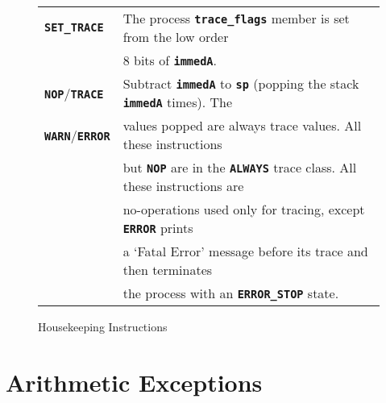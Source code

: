 \documentclass[12pt]{article}
\newcommand{\TT}[1]{{\tt \bfseries #1}}
\newlength{\figurewidth}
\newenvironment{boxedfigure}[1][!btp]%
	{\begin{figure*}[#1]
	 \begin{lrbox}{\figurebox}
	 \begin{minipage}{\figurewidth}

	 \vspace*{1ex}}%
	{
	 \vspace*{1ex}

	 \end{minipage}
	 \end{lrbox}

	 \centering
	 \fbox{\hspace*{0.1in}\usebox{\figurebox}\hspace*{0.1in}}
	 \end{figure*}}
\begin{document}
\begin{boxedfigure}

\begin{center}
\small
\begin{tabular}{|l|l|}
\hline
\TT{SET\_TRACE}
    & The process \TT{trace\_flags} member is set from the low order \\
    & 8 bits of \TT{immedA}.
\\\hline
\TT{NOP}/\TT{TRACE}
    & Subtract \TT{immedA} to \TT{sp} (popping the stack \TT{immedA} times).
      The \\
\TT{WARN}/\TT{ERROR}
    & values popped are always trace values.  All these instructions \\
    & but \TT{NOP} are in the \TT{ALWAYS} trace class.  All these instructions
      are \\
    & no-operations used only for tracing, except \TT{ERROR} prints \\
    & a `Fatal Error' message before its trace and then terminates \\
    & the process with an \TT{ERROR\_STOP} state.
\\\hline
\end{tabular}
\end{center}
\vspace*{-3ex}
\caption{Housekeeping Instructions}
\label{HOUSEKEEPING-INSTRUCTIONS}
\end{boxedfigure}

\section{Arithmetic Exceptions}
\label{ARITHMETIC-EXCEPTIONS}
\end{document}
